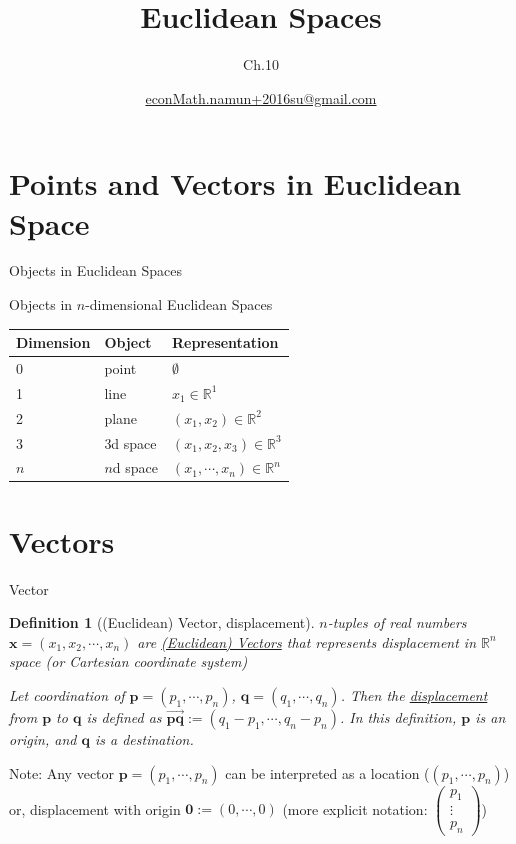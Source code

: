 \documentclass[final]{beamer}
\author[조남운]{\url{econMath.namun+2016su@gmail.com}}
\title{Euclidean Spaces}
\subtitle{Ch.10}
\newtheorem{defn}{Definition}
\begin{document}
	
\maketitle


\section{Points and Vectors in Euclidean Space} %
\label{sec:points_and_vectors_in_euclidean_space}
\begin{frame}[t]{Objects in Euclidean Spaces}
\begin{block}
	{Objects in $n$-dimensional Euclidean Spaces}
	\begin{tabular}
		{lll}
		Dimension & Object & Representation\\
		\hline\hline
		0 & point & $\emptyset$\\
		1 & line & $x_1\in \mathbb{R}^1$\\
		2 & plane & $(x_1,x_2)\in \mathbb{R}^2$\\
		3 & 3d space & $(x_1,x_2,x_3)\in \mathbb{R}^3$\\
		$n$ & $n$d space  & $(x_1,\cdots,x_n)\in\mathbb{R}^n$
	\end{tabular}
\end{block}
\end{frame}

\section{Vectors} %
\label{sec:vectors}

\begin{frame}[t]{Vector}
	\begin{defn}
		[(Euclidean) Vector, displacement]
		$n$-tuples of real numbers $\mathbf{x}=(x_1,x_2,\cdots,x_n)$ are \uline{(Euclidean) Vectors} that represents displacement in $\mathbb{R}^n$  space (or Cartesian coordinate system)
		
		Let coordination of $\mathbf{p}=(p_1,\cdots,p_n)$, $\mathbf{q}=(q_1,\cdots,q_n)$. Then the \uline{displacement} from $\mathbf{p}$ to $\mathbf{q}$ is defined as $\overrightarrow{\mathbf{pq}}:=(q_1-p_1,\cdots,q_n-p_n)$. In this definition, $\mathbf{p}$ is an origin, and $\mathbf{q}$ is a destination. 
	\end{defn}
	Note: Any vector $\mathbf{p}=(p_1,\cdots,p_n)$ can be interpreted as a location ($(p_1,\cdots,p_n)$) or, displacement with origin $\mathbf{0}:=(0,\cdots,0)$ (more explicit notation: $\begin{pmatrix}
		p_1 \\
		\vdots\\
		p_n
	\end{pmatrix}$)
\end{frame}
\end{document}
